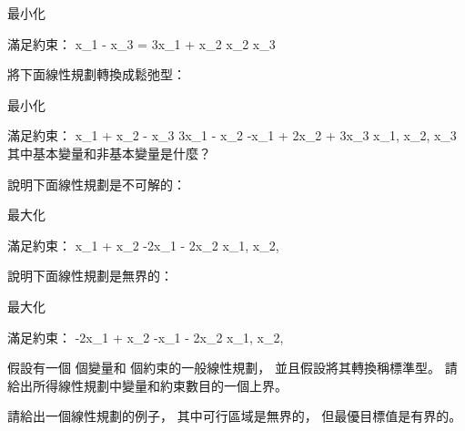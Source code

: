最小化 

滿足約束：
\startformula\startmathalignment[n=7,
  align={right,right,right,right,right,right, middle}]
\NC  x_1 \NC   \NC     \NC - \NC x_3 \NC =  \NR
\NC 3x_1 \NC + \NC x_2 \NC   \NC     \NC \ge {} \NR
\NC      \NC   \NC x_2 \NC   \NC     \NC \ge {} \NR
\NC      \NC   \NC     \NC   \NC x_3 \NC \le {} \NR
\stopmathalignment\stopformula
\stopEXERCISE

\startANSWER
{}
\stopANSWER

\startEXERCISE
將下面線性規劃轉換成鬆弛型：

最小化 

滿足約束：
\startformula\startmathalignment[n=7,
  align={right,right,right,right,right,right, middle}]
\NC  x_1 \NC + \NC  x_2 \NC - \NC  x_3 \NC \le {} \NR
\NC 3x_1 \NC - \NC  x_2 \NC   \NC      \NC \ge {} \NR
\NC -x_1 \NC + \NC 2x_2 \NC + \NC 3x_3 \NC \ge {} \NR
\NC      \NC x_1, \NC x_2, \NC x_3 \NC \NC \ge {} \NR
\stopmathalignment\stopformula
其中基本變量和非基本變量是什麼？
\stopEXERCISE

\startANSWER
{}
\stopANSWER

\startEXERCISE
說明下面線性規劃是不可解的：

最大化 

滿足約束：
\startformula\startmathalignment[n=5,
  align={right,right,right,right,right}]
\NC   x_1 \NC + \NC  x_2 \NC \le {} \NR
\NC -2x_1 \NC - \NC 2x_2 \NC \le {} \NR
\NC      \NC x_1, \NC x_2, \NC \ge {} \NR
\stopmathalignment\stopformula
\stopEXERCISE

\startANSWER
{}
\stopANSWER

\startEXERCISE
說明下面線性規劃是無界的：

最大化 

滿足約束：
\startformula\startmathalignment[n=5,
  align={right,right,right,right,right}]
\NC -2x_1 \NC + \NC  x_2 \NC \le {} \NR
\NC  -x_1 \NC - \NC 2x_2 \NC \le {} \NR
\NC      \NC x_1, \NC x_2, \NC \ge {} \NR
\stopmathalignment\stopformula
\stopEXERCISE

\startANSWER
{}
\stopANSWER

\startEXERCISE
假設有一個  個變量和  個約束的一般線性規劃，
並且假設將其轉換稱標準型。
請給出所得線性規劃中變量和約束數目的一個上界。
\stopEXERCISE

\startANSWER
{}
\stopANSWER

\startEXERCISE
請給出一個線性規劃的例子，
其中可行區域是無界的，
但最優目標值是有界的。
\stopEXERCISE

\startANSWER
{}
\stopANSWER

\stopsection
